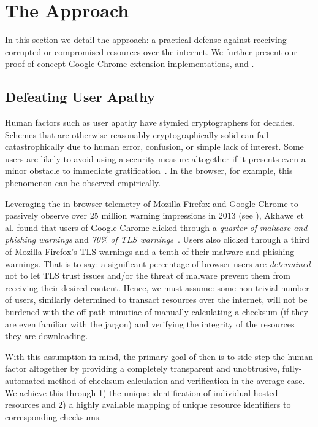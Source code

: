 \section{The \SYSTEM{} Approach} \label{sec:approach}

In this section we detail the \SYSTEM{} approach: a practical defense against
receiving corrupted or compromised resources over the internet. We further
present our proof-of-concept Google Chrome extension implementations, \DNSSYS{}
and \DHTSYS{}.

\subsection{Defeating User Apathy}

Human factors such as user apathy have stymied cryptographers for decades.
Schemes that are otherwise reasonably cryptographically solid can fail
catastrophically due to human error, confusion, or simple lack of interest. Some
users are likely to avoid using a security measure altogether if it presents
even a minor obstacle to immediate gratification~\cite{Clickthrough, PGPBad}. In
the browser, for example, this phenomenon can be observed empirically.

Leveraging the in-browser telemetry of Mozilla Firefox and Google Chrome to
passively observe over 25 million warning impressions in 2013 (see
), Akhawe et al. found that users of Google Chrome clicked
through a \emph{quarter of malware and phishing warnings} and \emph{70\% of TLS
warnings}~\cite{Clickthrough}. Users also clicked through a third of Mozilla
Firefox's TLS warnings and a tenth of their malware and phishing warnings. That
is to say: a significant percentage of browser users are \emph{determined} not
to let TLS trust issues and/or the threat of malware prevent them from receiving
their desired content. Hence, we must assume: some non-trivial number of users,
similarly determined to transact resources over the internet, will not be
burdened with the off-path minutiae of manually calculating a checksum (if they
are even familiar with the jargon) and verifying the integrity of the resources
they are downloading.

With this assumption in mind, the primary goal of \SYSTEM{} then is to side-step
the human factor altogether by providing a completely transparent and
unobtrusive, fully-automated method of checksum calculation and verification in
the average case. We achieve this through 1) the unique identification of
individual hosted resources and 2) a highly available mapping of unique resource
identifiers to corresponding checksums.

